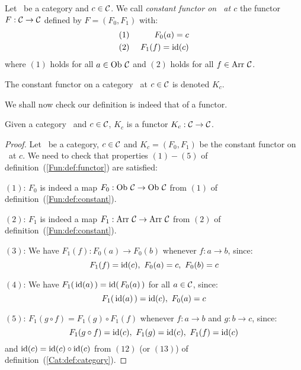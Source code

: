 \begin{defin}\label{Fun:def:constant}
    Let \Cat\ be a category and $c\in\mbox{$\cal C$}$. We call {\em constant functor on 
    \Cat\ at $c$} the functor $F:\mbox{$\cal C$}\to\mbox{$\cal C$}$ defined by 
    $F=(F_{0},F_{1})$ with:
        \begin{eqnarray*}
            (1)&\ &F_{0}(a) = c\\
            (2)&\ &F_{1}(f) = \mbox{\rm id}(c)
        \end{eqnarray*}
    where $(1)$ holds for all $a\in\mbox{\rm Ob}\ \mbox{$\cal C$}$ and $(2)$ holds for all
    $f\in\mbox{\rm Arr}\ \mbox{$\cal C$}$.
\end{defin}

\begin{notation}\label{Fun:notation:constant}
    The constant functor on a category \Cat\ at $c\in\mbox{$\cal C$}$ is denoted $K_{c}$.
\end{notation}

\noindent
We shall now check our definition is indeed that of a functor.

\begin{prop}\label{Fun:prop:constant}
    Given a category \Cat\ and $c\in\mbox{$\cal C$}$, $K_{c}$ is a functor $K_{c}:
    \mbox{$\cal C$}\to\mbox{$\cal C$}$.
\end{prop}
\begin{proof}
    Let \Cat\ be a category, $c\in\mbox{$\cal C$}$ and $K_{c}=(F_{0},F_{1})$ be the 
    constant functor on \Cat\ at $c$. We need to check that properties 
    $(1)-(5)$ of definition~(\ref{Fun:def:functor}) are satisfied:

    $(1)$: $F_{0}$ is indeed a map $F_{0}:\ob\ \Cat \to\ob\ \Cat$ from $(1)$ 
    of definition~(\ref{Fun:def:constant}).

    $(2)$: $F_{1}$ is indeed a map $F_{1}:\arr\ \Cat\to\arr\ \Cat$ from $(2)$ 
    of definition~(\ref{Fun:def:constant}).

    $(3)$: We have $F_{1}(f):F_{0}(a)\to F_{0}(b)$ whenever $f:a\to b$, since:
        \[
            F_{1}(f)=\id(c),\  F_{0}(a)=c,\ F_{0}(b)=c
        \]

    $(4)$: We have $F_{1}(\,\mbox{\rm id}(a)\,)=\mbox{\rm id}(\,F_{0}(a)\,)$ for
    all $a\in\mbox{$\cal C$}$, since:
        \[
            F_{1}(\,\id(a)\,)=\id(c),\ F_{0}(a)=c
        \]

    $(5)$: $F_{1}(g\circ f)=F_{1}(g)\circ F_{1}(f)$ whenever $f:a\to b$ 
    and $g:b\to c$, since:
        \[
            F_{1}(g\circ f) = \id(c),\ F_{1}(g)=\id(c),\  F_{1}(f)=\id(c)
        \]
    and $\mbox{\rm id}(c)=\mbox{\rm id}(c)\circ\mbox{\rm id}(c)$ from $(12)$ (or $(13)$) of
    definition~(\ref{Cat:def:category}).
\end{proof}
